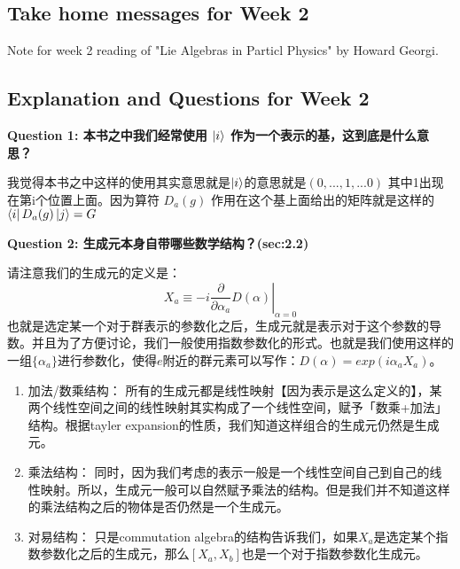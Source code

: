 \subsection{Take home messages for Week 2}
Note for week 2 reading of "Lie Algebras in Particl Physics" by Howard Georgi.








\subsection{Explanation and Questions for Week 2}

\textbf{Question 1: 本书之中我们经常使用 $ \ket{i} $ 作为一个表示的基，这到底是什么意思？}

我觉得本书之中这样的使用其实意思就是$ \ket{i} $的意思就是$ (0,...,1,...0) $ 其中1出现在第i个位置上面。因为算符 $ D_a(g) $ 作用在这个基上面给出的矩阵就是这样的 $ \bra{i} D_a(g) \ket{j} = G $


\textbf{Question 2: 生成元本身自带哪些数学结构？(sec:2.2)}

请注意我们的生成元的定义是：
\begin{equation}
  X_a\equiv-i\left.\frac{\partial}{\partial\alpha_a}D(\alpha)\right|_{\alpha=0}
  \label{eq:generatordef}
\end{equation}
也就是选定某一个对于群表示的参数化之后，生成元就是表示对于这个参数的导数。并且为了方便讨论，我们一般使用指数参数化的形式。也就是我们使用这样的一组$ \{ \alpha_a\} $进行参数化，使得$ e $附近的群元素可以写作：$ D(\alpha) = exp(i \alpha_a X_a) $。

\begin{enumerate}
  \item 加法/数乘结构： 
所有的生成元都是线性映射【因为表示是这么定义的】，某两个线性空间之间的线性映射其实构成了一个线性空间，赋予「数乘+加法」结构。根据tayler expansion的性质，我们知道这样组合的生成元仍然是生成元。
\item 乘法结构：
同时，因为我们考虑的表示一般是一个线性空间自己到自己的线性映射。所以，生成元一般可以自然赋予乘法的结构。但是我们并不知道这样的乘法结构之后的物体是否仍然是一个生成元。
\item 对易结构：
只是commutation algebra的结构告诉我们，如果$ X_a $是选定某个指数参数化之后的生成元，那么$ [X_a, X_b] $也是一个对于指数参数化生成元。
\end{enumerate}

